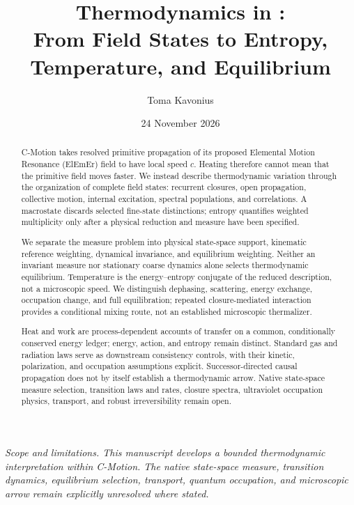 \documentclass[11pt]{article}
\title{\textbf{Thermodynamics in \cmotion{}:}\\
From Field States to Entropy, Temperature, and Equilibrium}
\author{Toma Kavonius}
\date{24 November 2026}
\theoremstyle{definition}
\newcommand{\ElEmEr}{\mbox{ElEmEr}}
\begin{document}
\maketitle

\begin{center}
\small\itshape
Scope and limitations.  This manuscript develops a bounded thermodynamic interpretation
within C-Motion.  The native state-space measure, transition dynamics, equilibrium
selection, transport, quantum occupation, and microscopic arrow remain explicitly
unresolved where stated.
\end{center}
\vspace{0.6em}

\begin{abstract}
C-Motion takes resolved primitive propagation of its proposed Elemental
Motion Resonance (\ElEmEr{}) field to have local speed $c$.  Heating therefore
cannot mean that the primitive field moves faster.  We instead describe thermodynamic
variation through the organization of complete field states: recurrent closures,
open propagation, collective motion, internal excitation, spectral populations,
and correlations.  A macrostate discards selected fine-state distinctions;
entropy quantifies weighted multiplicity only after a physical reduction and
measure have been specified.

We separate the measure problem into physical state-space support, kinematic
reference weighting, dynamical invariance, and equilibrium weighting.  Neither
an invariant measure nor stationary coarse dynamics alone selects thermodynamic
equilibrium.  Temperature is the energy--entropy conjugate of the reduced
description, not a microscopic speed.  We distinguish dephasing, scattering,
energy exchange, occupation change, and full equilibration; repeated
closure-mediated interaction provides a conditional mixing route, not an
established microscopic thermalizer.

Heat and work are process-dependent accounts of transfer on a common,
conditionally conserved energy ledger; energy, action, and entropy remain
distinct.  Standard gas and radiation laws serve as downstream consistency
controls, with their kinetic, polarization, and occupation assumptions explicit.
Successor-directed causal propagation does not by itself establish a
thermodynamic arrow.  Native state-space measure selection, transition laws and
rates, closure spectra, ultraviolet occupation physics, transport, and robust
irreversibility remain open.
\end{abstract}
\end{document}
